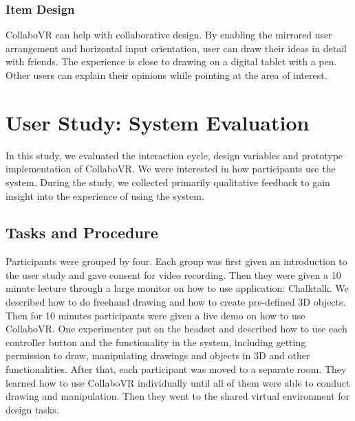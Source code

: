 \documentclass{sigchi}
\begin{document}
\subsubsection{Item Design}
CollaboVR can help with collaborative design. By enabling the mirrored user arrangement and horizontal input orientation, user can draw their ideas in detail with friends. The experience is close to drawing on a digital tablet with a pen. Other users can explain their opinions while pointing at the area of interest.

\section{User Study: System Evaluation}

In this study, we evaluated the interaction cycle, design variables and prototype implementation of CollaboVR. We were interested in how participants use the system. During the study, we collected primarily qualitative feedback to gain insight into the experience of using the system.

\subsection{Tasks and Procedure}
Participants were grouped by four. Each group was first given an introduction to the user study and gave consent for video recording. Then they were given a 10 minute lecture through a large monitor on how to use application: Chalktalk. We described how to do freehand drawing and how to create pre-defined 3D objects.
Then for 10 minutes participants were given a live demo on how to use CollaboVR. One experimenter put on the headset and described how to use each controller button and the functionality in the system, including getting permission to draw, manipulating drawings and objects in 3D and other functionalities.
After that, each participant was moved to a separate room. They learned how to use CollaboVR individually until all of them were able to conduct drawing and manipulation. Then they went to the shared virtual environment for design tasks. 
\end{document}

